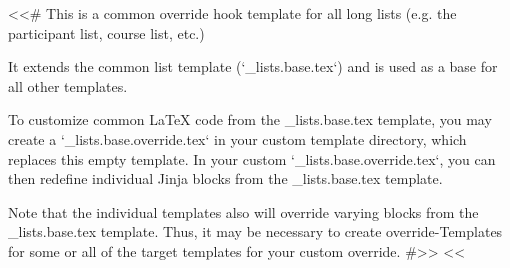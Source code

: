 <<# This is a common override hook template for all long lists (e.g. the participant list, course list, etc.)

    It extends the common list template (`_lists.base.tex`) and is used as a base for all other templates.

    To customize common LaTeX code from the _lists.base.tex template, you may create a `_lists.base.override.tex` in
    your custom template directory, which replaces this empty template. In your custom `_lists.base.override.tex`, you
    can then redefine individual Jinja blocks from the _lists.base.tex template.

    Note that the individual templates also will override varying blocks from the _lists.base.tex template. Thus, it
    may be necessary to create override-Templates for some or all of the target templates for your custom override.
#>>
<<%
